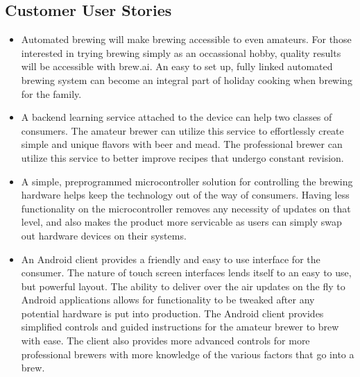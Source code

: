 \documentclass[draftclsnofoot,onecolumn,letterpaper,10pt]{IEEEtran}
\begin{document}
\subsection{Customer User Stories}
\begin{itemize}
	\item Automated brewing will make brewing accessible to even amateurs. For those interested in trying brewing simply as an
		occassional hobby, quality results will be accessible with brew.ai. An easy to set up, fully linked automated brewing system can
		become an integral part of holiday cooking when brewing for the family.
	\item A backend learning service attached to the device can help two classes of consumers. The amateur brewer can utilize this 
		service to effortlessly create simple and unique flavors with beer and mead. The professional brewer can utilize this service
		to better improve recipes that undergo constant revision.
	\item A simple, preprogrammed microcontroller solution for controlling the brewing hardware helps keep the technology out of the way
		of consumers. Having less functionality on the microcontroller removes any necessity of updates on that level, and also makes
		the product more servicable as users can simply swap out hardware devices on their systems.
	\item An Android client provides a friendly and easy to use interface for the consumer. The nature of touch screen interfaces lends 
		itself to an easy to use, but powerful layout. The ability to deliver over the air updates on the fly to Android applications
		allows for functionality to be tweaked after any potential hardware is put into production. The Android client provides simplified
		controls and guided instructions for the amateur brewer to brew with ease. The client also provides more advanced controls for more
		professional brewers with more knowledge of the various factors that go into a brew.
\end{itemize}
\end{document}
